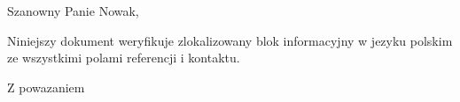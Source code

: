 \documentclass[basic, infoblock, lang=polish]{../../onlinebrief24}
\begin{document}
\begin{letter}{}
\opening{Szanowny Panie Nowak,}

Niniejszy dokument weryfikuje zlokalizowany blok informacyjny w jezyku
polskim ze wszystkimi polami referencji i kontaktu.

\closing{Z powazaniem}
\end{letter}
\end{document}
